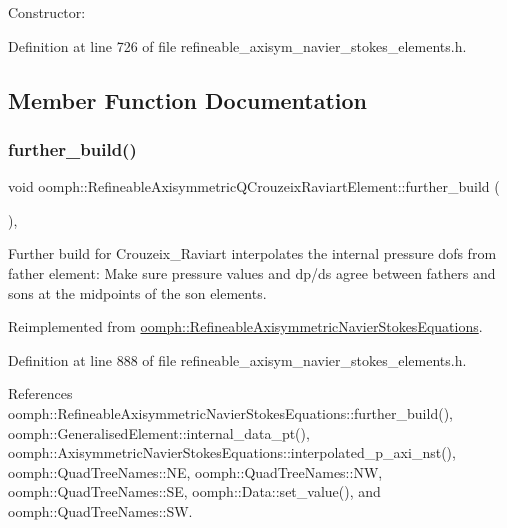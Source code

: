 Constructor\+: 



Definition at line 726 of file refineable\+\_\+axisym\+\_\+navier\+\_\+stokes\+\_\+elements.\+h.



\subsection{Member Function Documentation}
\mbox{\label{classoomph_1_1RefineableAxisymmetricQCrouzeixRaviartElement_acff18b2da6b89e140fcb7bf2af3777bc}} 
\subsubsection{\texorpdfstring{further\+\_\+build()}{further\_build()}}
{\footnotesize\ttfamily void oomph\+::\+Refineable\+Axisymmetric\+Q\+Crouzeix\+Raviart\+Element\+::further\+\_\+build (\begin{DoxyParamCaption}{ }\end{DoxyParamCaption})\hspace{0.3cm}{\ttfamily [inline]}, {\ttfamily [virtual]}}

Further build for Crouzeix\+\_\+\+Raviart interpolates the internal pressure dofs from father element\+: Make sure pressure values and dp/ds agree between fathers and sons at the midpoints of the son elements. 

Reimplemented from \hyperlink{classoomph_1_1RefineableAxisymmetricNavierStokesEquations_a9e0d4b625595604ff1297b4c86a011bd}{oomph\+::\+Refineable\+Axisymmetric\+Navier\+Stokes\+Equations}.



Definition at line 888 of file refineable\+\_\+axisym\+\_\+navier\+\_\+stokes\+\_\+elements.\+h.



References oomph\+::\+Refineable\+Axisymmetric\+Navier\+Stokes\+Equations\+::further\+\_\+build(), oomph\+::\+Generalised\+Element\+::internal\+\_\+data\+\_\+pt(), oomph\+::\+Axisymmetric\+Navier\+Stokes\+Equations\+::interpolated\+\_\+p\+\_\+axi\+\_\+nst(), oomph\+::\+Quad\+Tree\+Names\+::\+NE, oomph\+::\+Quad\+Tree\+Names\+::\+NW, oomph\+::\+Quad\+Tree\+Names\+::\+SE, oomph\+::\+Data\+::set\+\_\+value(), and oomph\+::\+Quad\+Tree\+Names\+::\+SW.

